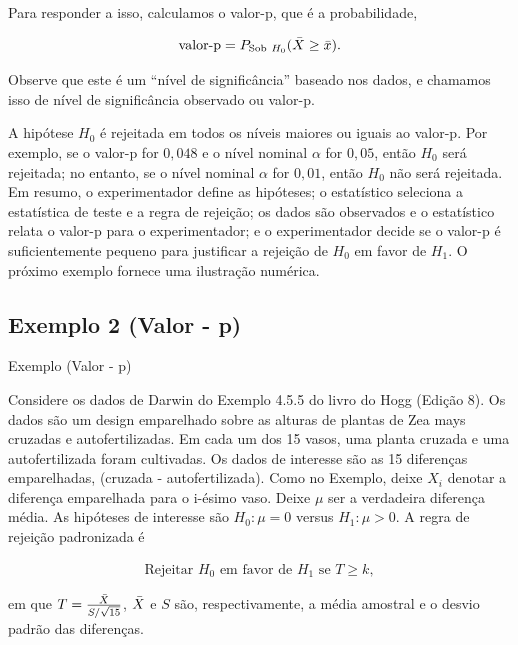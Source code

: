 \documentclass[12pt]{beamer}
\begin{document}
\begin{frame}{}
\begin{block}{}
\justifying
Para responder a isso, calculamos o valor-p, que é a probabilidade,

\begin{align*}
\text{valor-p} = P_{\text{Sob}~H_0}( \Bar{X} \geq \Bar{x}).
\end{align*}

Observe que este é um ``nível de significância'' baseado nos dados, e chamamos isso de nível de significância observado ou valor-p. 
\end{block}
\end{frame}

\begin{frame}{}
\begin{block}{}
\justifying
A hipótese $H_0$ é rejeitada em todos os níveis maiores ou iguais ao valor-p. Por exemplo, se o valor-p for $0,048$ e o nível nominal $\alpha$ for $0,05$, então $H_0$ será rejeitada; no entanto, se o nível nominal $\alpha$ for $0,01$, então $H_0$ não será rejeitada. Em resumo, o experimentador define as hipóteses; o estatístico seleciona a estatística de teste e a regra de rejeição; os dados são observados e o estatístico relata o valor-p para o experimentador; e o experimentador decide se o valor-p é suficientemente pequeno para justificar a rejeição de $H_0$ em favor de $H_1$. O próximo exemplo fornece uma ilustração numérica.
\end{block}
\end{frame}

\subsection{Exemplo 2 (Valor - p)}
\begin{frame}{Exemplo (Valor - p)}
\begin{block}{}
\justifying
Considere os dados de Darwin do Exemplo 4.5.5 do livro do Hogg (Edição 8). Os dados são um design emparelhado sobre as alturas de plantas de Zea mays cruzadas e autofertilizadas. Em cada um dos 15 vasos, uma planta cruzada e uma autofertilizada foram cultivadas. Os dados de interesse são as 15 diferenças emparelhadas, (cruzada - autofertilizada). Como no Exemplo, deixe $X_i$ denotar a diferença emparelhada para o i-ésimo vaso. Deixe $\mu$ ser a verdadeira diferença média. As hipóteses de interesse são $H_0 : \mu = 0$ versus $H_1 : \mu > 0$. A regra de rejeição padronizada é

\begin{align}
\text{Rejeitar } H_0 \text{ em favor de } H_1 \text{ se } T \geq k,
\end{align}

em que $T = \frac{\Bar{X}}{S/\sqrt{15}}$, $\Bar{X}$ e $S$ são, respectivamente, a média amostral e o desvio padrão das diferenças. 
\end{block}
\end{frame}
\end{document}

